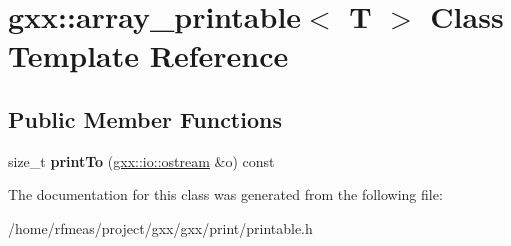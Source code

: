 \hypertarget{classgxx_1_1array__printable}{}\section{gxx\+:\+:array\+\_\+printable$<$ T $>$ Class Template Reference}
\label{classgxx_1_1array__printable}
\subsection*{Public Member Functions}
\begin{DoxyCompactItemize}
\item 
size\+\_\+t {\bfseries print\+To} (\hyperlink{classgxx_1_1io_1_1ostream}{gxx\+::io\+::ostream} \&o) const \hypertarget{classgxx_1_1array__printable_a90cd593367e3f157ffbc2d077b942962}{}\label{classgxx_1_1array__printable_a90cd593367e3f157ffbc2d077b942962}

\end{DoxyCompactItemize}


The documentation for this class was generated from the following file\+:\begin{DoxyCompactItemize}
\item 
/home/rfmeas/project/gxx/gxx/print/printable.\+h\end{DoxyCompactItemize}
